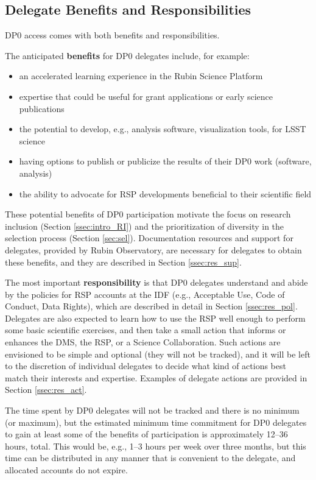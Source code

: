\documentclass[DM,lsstdraft,authoryear,toc]{lsstdoc}
\begin{document}
\subsection{Delegate Benefits and Responsibilities}\label{ssec:intro_del}

DP0 access comes with both benefits and responsibilities.

The anticipated {\bf benefits} for DP0 delegates include, for example:
\begin{itemize}
\item an accelerated learning experience in the Rubin Science Platform
\item expertise that could be useful for grant applications or early science publications
\item the potential to develop, e.g., analysis software, visualization tools, for LSST science 
\item having options to publish or publicize the results of their DP0 work (software, analysis)
\item the ability to advocate for RSP developments beneficial to their scientific field
\end{itemize}

These potential benefits of DP0 participation motivate the focus on research inclusion (Section \ref{ssec:intro_RI}) and the prioritization of diversity in the selection process (Section \ref{sec:sel}).
Documentation resources and support for delegates, provided by Rubin Observatory, are necessary for delegates to obtain these benefits, and they are described in Section \ref{ssec:res_sup}.

The most important {\bf responsibility} is that DP0 delegates understand and abide by the policies for RSP accounts at the IDF (e.g., Acceptable Use, Code of Conduct, Data Rights), which are described in detail in Section \ref{ssec:res_pol}.
Delegates are also expected to learn how to use the RSP well enough to perform some basic scientific exercises, and then take a small action that informs or enhances the DMS, the RSP, or a Science Collaboration. 
Such actions are envisioned to be simple and optional (they will not be tracked), and it will be left to the discretion of individual delegates to decide what kind of actions best match their interests and expertise.
Examples of delegate actions are provided in Section \ref{ssec:res_act}.

The time spent by DP0 delegates will not be tracked and there is no minimum (or maximum), but the estimated minimum time commitment for DP0 delegates to gain at least some of the benefits of participation is approximately 12--36 hours, total.
This would be, e.g., 1--3 hours per week over three months, but this time can be distributed in any manner that is convenient to the delegate, and allocated accounts do not expire.
\end{document}
